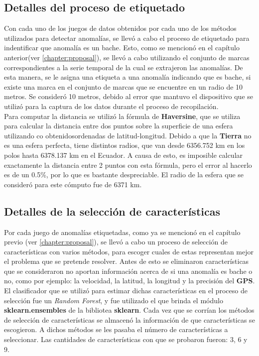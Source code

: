 	\subsection{Detalles del proceso de etiquetado}
		Con cada uno de los juegos de datos obtenidos por cada uno de los métodos utilizados para detectar anomalías, se llevó a cabo
		el proceso de etiquetado para indentificar que anomalía es un bache. Esto, como se mencionó en el capítulo anterior(ver \ref{chapter:proposal}),
		se llevó a cabo utilizando el conjunto de marcas correspondientes a la serie temporal de la cual se extrajeron las anomalías. De esta manera, se
		le asigna una etiqueta a una anomalía indicando que es bache, si existe una marca en el conjunto de marcas que se encuentre en un radio de 10
		metros. Se consideró 10 metros, debido al error que mantuvo el dispositivo que se utilizó para la captura de los datos durante el proceso de
		recopilación.\\
		\indent Para computar la distancia se utilizó la fórmula de \textbf{Haversine}, que se utiliza para calcular la distancia entre dos puntos sobre la
		superficie de una esfera utilizando co obtenidosordenadas de latitud-longitud. Debido a que la \textbf{Tierra} no es una esfera perfecta, tiene
		distintos radios, que van desde 6356.752 km en los polos hasta 6378.137 km en el Ecuador. A causa de esto, es imposible calcular exactamente la
		distancia entre 2 puntos con esta fórmula, pero el error al hacerlo es de un 0.5\%, por lo que es bastante despreciable. El radio de la esfera
		que se consideró para este cómputo fue de 6371 km.\\

	\subsection{Detalles de la selección de características}
		Por cada juego de anomalías etiquetadas, como ya se mencionó en el capítulo previo (ver \ref{chapter:proposal}), se llevó a cabo un proceso
		de selección de características con varios métodos, para escoger cuales de estas representan mejor el problema que se pretende resolver.
		Antes de esto se eliminaron características que se consideraron no aportan información acerca de si una anomalía es bache o no, como por ejemplo:
		la velocidad, la latitud, la longitud y la precisión del \textbf{GPS}.\\
		\indent El clasificador que se utilizó para estimar dichas características en el proceso de selección fue un \emph{Random Forest}, y fue
		utilizado el que brinda el módulo \textbf{sklearn.ensembles} de la bibliotea \textbf{sklearn}. Cada vez que se corrían los métodos de selección
		de características se almacenó la información de que características se escogieron. A dichos métodos se les pasaba el número de
		características a seleccionar. Las cantidades de características con que se probaron fueron: 3, 6 y 9.\\

